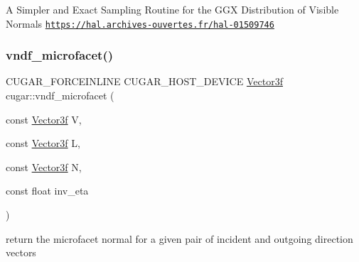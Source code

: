 A Simpler and Exact Sampling Routine for the G\+GX Distribution of Visible Normals \href{https://hal.archives-ouvertes.fr/hal-01509746}{\tt https\+://hal.\+archives-\/ouvertes.\+fr/hal-\/01509746} \mbox{\label{group___b_s_d_f_module_gaa871796466d7998c178e28e2eccd7248}} 
\subsubsection{\texorpdfstring{vndf\+\_\+microfacet()}{vndf\_microfacet()}}
{\footnotesize\ttfamily C\+U\+G\+A\+R\+\_\+\+F\+O\+R\+C\+E\+I\+N\+L\+I\+NE C\+U\+G\+A\+R\+\_\+\+H\+O\+S\+T\+\_\+\+D\+E\+V\+I\+CE \hyperlink{structcugar_1_1_vector}{Vector3f} cugar\+::vndf\+\_\+microfacet (\begin{DoxyParamCaption}\item[{const \hyperlink{structcugar_1_1_vector}{Vector3f}}]{V,  }\item[{const \hyperlink{structcugar_1_1_vector}{Vector3f}}]{L,  }\item[{const \hyperlink{structcugar_1_1_vector}{Vector3f}}]{N,  }\item[{const float}]{inv\+\_\+eta }\end{DoxyParamCaption})}

return the microfacet normal for a given pair of incident and outgoing direction vectors 